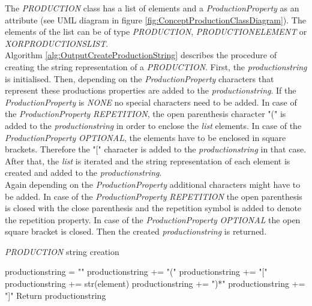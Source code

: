 The \textit{PRODUCTION} class has a list of elements and a \textit{ProductionProperty} as an attribute (see UML diagram in figure \ref{fig:ConceptProductionClassDiagram}).
The elements of the list can be of type \textit{PRODUCTION}, \textit{PRODUCTION\textunderscore ELEMENT} or \textit{XOR\textunderscore PRODUCTIONS\textunderscore LIST}.\\
Algorithm \ref{alg:OutputCreateProductionString} describes the procedure of creating the string representation of a \textit{PRODUCTION}.
First, the \textit{production\textunderscore string} is initialised.
Then, depending on the \textit{ProductionProperty} characters that represent these productions properties are added to the \textit{production\textunderscore string}.
If the \textit{ProductionProperty} is \textit{NONE} no special characters need to be added.
In case of the \textit{ProductionProperty} \textit{REPETITION}, the open parenthesis character "(" is added to the \textit{production\textunderscore string} in order to enclose the \textit{list} elements.
In case of the \textit{ProductionProperty} \textit{OPTIONAL}, the elements have to be enclosed in square brackets. Therefore the "[" character is added to the \textit{production\textunderscore string} in that case.\\
After that, the \textit{list} is iterated and the string representation of each element is created and added to the \textit{production\textunderscore string}.\\
Again depending on the \textit{ProductionProperty} additional characters might have to be added.
In case of the \textit{ProductionProperty} \textit{REPETITION} the open parenthesis is closed with the close parenthesis and the repetition symbol is added to denote the repetition property.
In case of the \textit{ProductionProperty} \textit{OPTIONAL} the open square bracket is closed.
Then the created \textit{production\textunderscore string} is returned.

\begin{algorithm}[H]
\caption{\textit{PRODUCTION} string creation}
\label{alg:OutputCreateProductionString}
\begin{algorithmic}[1]
\State production\textunderscore string = ""
	\State production\textunderscore string += "("
	\State production\textunderscore string += "["
\EndIf
{}
		\State production\textunderscore string += str(element)
\EndFor
{}
	\State production\textunderscore string += ")*"
	\State production\textunderscore string += "]"
\EndIf
\State Return production\textunderscore string
\end{algorithmic}
\end{algorithm}

